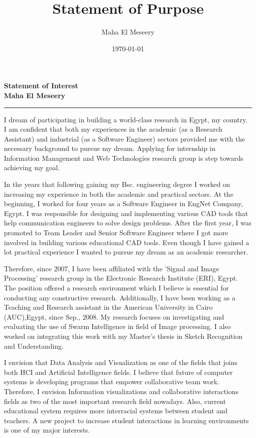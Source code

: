 \documentclass[12pt]{article}%
\title{Statement of Purpose}
\author{Maha El Meseery }
\date{\today}
\begin{document}
\large
 \begin{center}
\textbf{ Statement of  Interest \\ Maha El Meseery } \hrule
\end{center}
\normalsize
I dream of participating in building a world-class research in Egypt, my country. I am confident that both my experiences in the academic (as a Research Assistant) and industrial (as a Software Engineer) sectors provided me with the necessary background to pursue my dream. Applying for internship in Information Management and Web Technologies research group is step towards achieving my goal.

In the years that following gaining my Bsc. engineering degree I worked on increasing my experience in both the academic and practical sectors. At the beginning, I worked for four years as a Software Engineer in EngNet Company, Egypt. I was responsible for designing and implementing various CAD tools that help communication engineers to solve design problems. After the first year, I was promoted to Team Leader and Senior Software Engineer where I got more involved in building various educational CAD tools. Even though I have gained a lot practical experience I wanted to pursue my dream as an academic researcher.

 Therefore, since 2007, I have been affiliated with the 'Signal and Image Processing' research group in the Electronic Research Institute (ERI), Egypt. The position offered a research environment which I believe is essential for conducting any constructive research.  Additionally, I have been working as a Teaching and Research assistant in the American University in Cairo (AUC),Egypt, since Sep., 2008. My research focuses on investigating and evaluating the use of Swarm Intelligence in field of Image processing. I also worked on integrating this work with my Master's thesis in Sketch Recognition and Understanding.


I envision that Data Analysis and Visualization as one of the fields that joins both HCI and Artificial Intelligence fields. I believe that future of computer systems is developing programs that empower collaborative team work. Therefore, I envision Information visualizations and collaborative interactions fields as two of the most important research field nowadays. Also, current educational system requires more interracial systems between student and teachers. A new project to increase student interactions in learning environments is one of my major interests.
\end{document}

